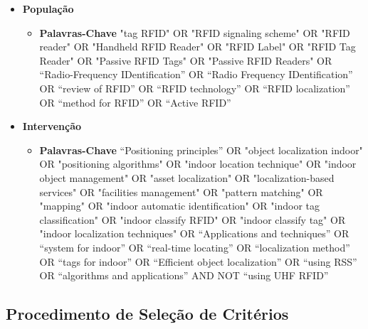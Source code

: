             \begin{itemize}
            \item \textbf{População}
                \begin{itemize}
                    \item \textbf{Palavras-Chave} "tag RFID"  OR  "RFID signaling scheme"  OR  "RFID reader"  OR  "Handheld RFID Reader"  OR  "RFID Label"  OR  "RFID Tag Reader"  OR  "Passive RFID Tags"  OR  "Passive RFID Readers" OR “Radio-Frequency IDentification” OR “Radio Frequency IDentification”  OR “review of RFID” OR “RFID  technology” OR “RFID localization” OR “method for RFID” OR “Active RFID”
                \end{itemize}
            \item \textbf{Intervenção }
                \begin{itemize}
            
             \item \textbf{Palavras-Chave} “Positioning principles” OR "object localization indoor"  OR  "positioning algorithms"  OR  "indoor location technique"  OR  "indoor object management"  OR  "asset localization"  OR  "localization-based services"  OR  "facilities management"  OR  "pattern matching"  OR  "mapping"  OR  "indoor automatic identification"  OR  "indoor tag classification"  OR  "indoor classify RFID"  OR  "indoor classify tag"  OR  "indoor localization techniques" OR “Applications and techniques” OR “system for indoor” OR “real-time locating” OR “localization method” OR “tags for indoor” OR “Efficient object localization” OR “using RSS” OR “algorithms and applications” AND NOT “using UHF RFID”
                   \end{itemize}
            \end{itemize}
             
            
    \subsection{Procedimento de Seleção de Critérios}

